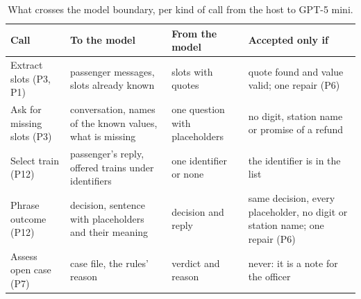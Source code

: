 \begin{table}[t]
\caption{What crosses the model boundary, per kind of call from the host to GPT-5 mini.}
\label{tab:boundary}
\centering
\footnotesize
\setlength{\tabcolsep}{4pt}\renewcommand{\arraystretch}{0.92}
\begin{tabular}{L{0.16}L{0.30}L{0.18}L{0.29}}
\toprule
Call & To the model & From the model & Accepted only if \\
\midrule
Extract slots (P3, P1) & passenger messages, slots already known & slots with quotes & quote found and value valid; one repair (P6) \\
Ask for missing slots (P3) & conversation, names of the known values, what is missing & one question with placeholders & no digit, station name or promise of a refund \\
Select train (P12) & passenger's reply, offered trains under identifiers & one identifier or none & the identifier is in the list \\
Phrase outcome (P12) & decision, sentence with placeholders and their meaning & decision and reply & same decision, every placeholder, no digit or station name; one repair (P6) \\
Assess open case (P7) & case file, the rules' reason & verdict and reason & never: it is a note for the officer \\
\bottomrule
\end{tabular}
\end{table}
